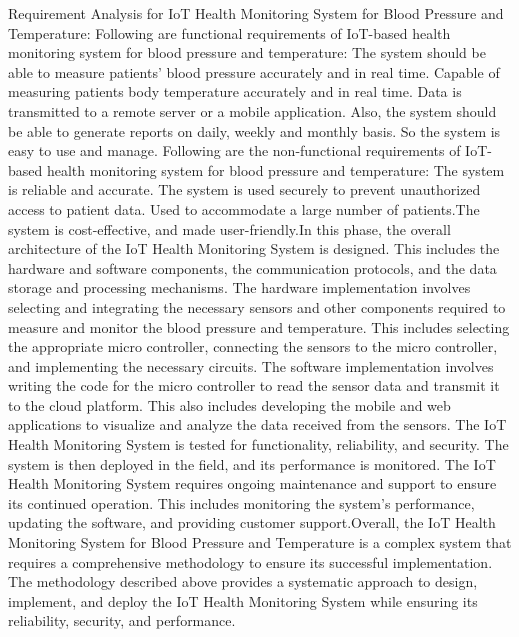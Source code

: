 \documentclass[conference]{IEEEtran}
\begin{document}
Requirement Analysis for IoT Health Monitoring System for Blood Pressure and Temperature:
Following are functional requirements of IoT-based health monitoring system for blood pressure and temperature:
The system should be able to measure patients' blood pressure accurately and in real time. Capable of measuring patients body temperature accurately and in real time. Data is transmitted to a remote server or a mobile application.
Also, the system should be able to generate reports on daily, weekly and monthly basis. So the system is easy to use and manage.
Following are the non-functional requirements of IoT-based health monitoring system for blood pressure and temperature:
The system is reliable and accurate. The system is used securely to prevent unauthorized access to patient data. Used to accommodate a large number of patients.The system is cost-effective, and made user-friendly.In this phase, the overall architecture of the IoT Health Monitoring System is designed. This includes the hardware and software components, the communication protocols, and the data storage and processing mechanisms.
The hardware implementation involves selecting and integrating the necessary sensors and other components required to measure and monitor the blood pressure and temperature. This includes selecting the appropriate micro controller, connecting the sensors to the micro controller, and implementing the necessary circuits.
The software implementation involves writing the code for the micro controller to read the sensor data and transmit it to the cloud platform. This also includes developing the mobile and web applications to visualize and analyze the data received from the sensors.
The IoT Health Monitoring System is tested for functionality, reliability, and security. The system is then deployed in the field, and its performance is monitored.
The IoT Health Monitoring System requires ongoing maintenance and support to ensure its continued operation. This includes monitoring the system's performance, updating the software, and providing customer support.Overall, the IoT Health Monitoring System for Blood Pressure and Temperature is a complex system that requires a comprehensive methodology to ensure its successful implementation. The methodology described above provides a systematic approach to design, implement, and deploy the IoT Health Monitoring System while ensuring its reliability, security, and performance.
\end{document}
